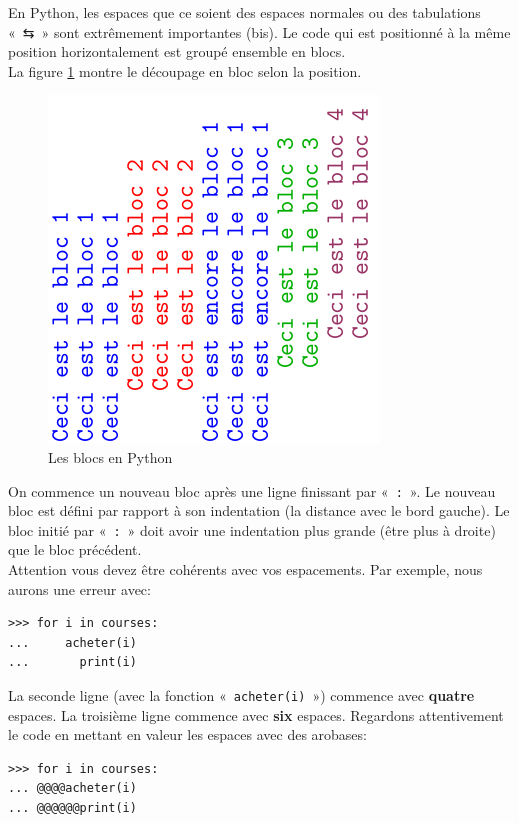 En Python, les espaces que ce soient des espaces normales ou des tabulations «~\textsf{⇆}~» sont extrêmement  importantes (bis). Le code qui est positionné à la même position horizontalement est groupé ensemble en blocs.\\


La figure \ref{fig:blocs} montre le découpage en bloc selon la position.
\begin{figure}[H]
\centering
\includegraphics[scale=1,angle=270]{images/blocs.pdf}
\caption{Les blocs en Python}
\label{fig:blocs}
\end{figure}

On commence un nouveau bloc après une ligne finissant   par «~\verb+:+~». Le nouveau bloc est défini par rapport à son indentation (la distance avec le bord gauche). Le bloc initié par «~\verb+:+~» doit avoir une indentation plus grande (être plus à droite) que le bloc précédent.\\


Attention vous devez être cohérents avec vos espacements. Par exemple, nous aurons une erreur avec:

\begin{Verbatim}[frame=single,rulecolor=\color{red}, label=erreur]
>>> for i in courses:
...     acheter(i)
...       print(i)
\end{Verbatim}

La seconde ligne (avec la fonction «~\texttt{acheter(i)}~») commence avec \textbf{quatre} espaces. La troisième ligne commence avec \textbf{six} espaces. Regardons attentivement le code en mettant en valeur les espaces avec des arobases:

\begin{Verbatim}[frame=single,rulecolor=\color{gray}, label=ne pas saisir]
>>> for i in courses:
... @@@@acheter(i)
... @@@@@@print(i)
\end{Verbatim}

